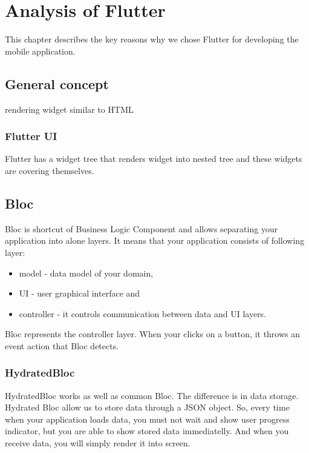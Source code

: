 \chapter{Analysis of Flutter}\label{ch:analysis-of-flutter}

This chapter describes the key reasons why we chose Flutter for developing the mobile application.


\section{General concept}\label{sec:general-concept}
rendering widget similar to HTML

\subsection{Flutter UI}\label{subsec:flutter-ui}
Flutter has a widget tree that renders widget into nested tree and these widgets are covering themselves.

\section{Bloc}\label{sec:bloc}
Bloc is shortcut of Business Logic Component and allows separating your application into alone layers.
It means that your application consists of following layer:
\begin{itemize}
    \item model - data model of your domain,
    \item UI - user graphical interface and 
    \item controller - it controls communication between data and UI layers.
\end{itemize}
Bloc represents the controller layer.
When your clicks on a button, it throws an event action that Bloc detects.

\subsection{HydratedBloc}\label{subsec:hydratedbloc}
HydratedBloc works as well as common Bloc.
The difference is in data storage.
Hydrated Bloc allow us to store data through a JSON object.
So, every time when your application loads data, you must not wait and show user progress indicator, but you are able to show stored data immediatelly.
And when you receive data, you will simply render it into screen.

